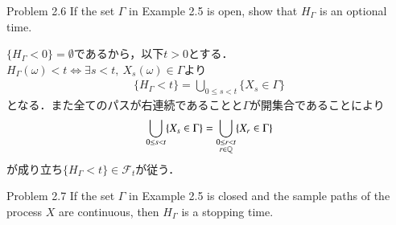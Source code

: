 	\begin{itembox}[l]{Problem 2.6}
		If the set $\Gamma$ in Example 2.5 is open, show that $H_\Gamma$ is 
		an optional time.
	\end{itembox}
	
	\begin{prf}
		$\{H_\Gamma < 0\}=\emptyset$であるから，以下$t > 0$とする．
		$H_\Gamma(\omega) < t \Leftrightarrow \exists s < t,\ X_s(\omega) \in \Gamma$より
		\begin{align}
			\{H_\Gamma < t\} = \bigcup_{0 \leq s < t} \{X_s \in \Gamma\}
		\end{align}
		となる．また全てのパスが右連続であることと$\Gamma$が開集合であることにより
		\begin{align}
			\bigcup_{0 \leq s < t} \{X_s \in \Gamma\}
			= \bigcup_{\substack{0 \leq r < t \\ r \in \mathbb{Q}}} \{X_r \in \Gamma\}
		\end{align}
		が成り立ち$\{H_\Gamma < t\} \in \mathscr{F}_t$が従う．
		\QED
	\end{prf}
	
	\begin{itembox}[l]{Problem 2.7}
		If the set $\Gamma$ in Example 2.5 is closed and the sample paths of the 
		process $X$ are continuous, then $H_\Gamma$ is a stopping time.
	\end{itembox}
	
